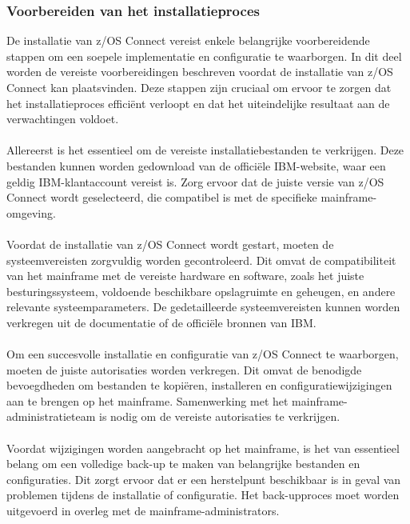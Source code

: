\subsubsection{Voorbereiden van het installatieproces}
\label{sec:Voorbereiden van het installatieproces}
De installatie van z/OS Connect vereist enkele belangrijke voorbereidende stappen om een soepele implementatie en configuratie te waarborgen. In dit deel worden de vereiste voorbereidingen beschreven voordat de installatie van z/OS Connect kan plaatsvinden. Deze stappen zijn cruciaal om ervoor te zorgen dat het installatieproces efficiënt verloopt en dat het uiteindelijke resultaat aan de verwachtingen voldoet. \autocite{Software2012}
\\ \\
Allereerst is het essentieel om de vereiste installatiebestanden te verkrijgen. Deze bestanden kunnen worden gedownload van de officiële IBM-website, waar een geldig IBM-klantaccount vereist is. Zorg ervoor dat de juiste versie van z/OS Connect wordt geselecteerd, die compatibel is met de specifieke mainframe-omgeving. \autocite{Software2012}
\\ \\
Voordat de installatie van z/OS Connect wordt gestart, moeten de systeemvereisten zorgvuldig worden gecontroleerd. Dit omvat de compatibiliteit van het mainframe met de vereiste hardware en software, zoals het juiste besturingssysteem, voldoende beschikbare opslagruimte en geheugen, en andere relevante systeemparameters. De gedetailleerde systeemvereisten kunnen worden verkregen uit de documentatie of de officiële bronnen van IBM. \autocite{Software2012}
\\ \\
Om een succesvolle installatie en configuratie van z/OS Connect te waarborgen, moeten de juiste autorisaties worden verkregen. Dit omvat de benodigde bevoegdheden om bestanden te kopiëren, installeren en configuratiewijzigingen aan te brengen op het mainframe. Samenwerking met het mainframe-administratieteam is nodig om de vereiste autorisaties te verkrijgen. \autocite{Software2012}
\\ \\
Voordat wijzigingen worden aangebracht op het mainframe, is het van essentieel belang om een volledige back-up te maken van belangrijke bestanden en configuraties. Dit zorgt ervoor dat er een herstelpunt beschikbaar is in geval van problemen tijdens de installatie of configuratie. Het back-upproces moet worden uitgevoerd in overleg met de mainframe-administrators.  \autocite{Software2012}
